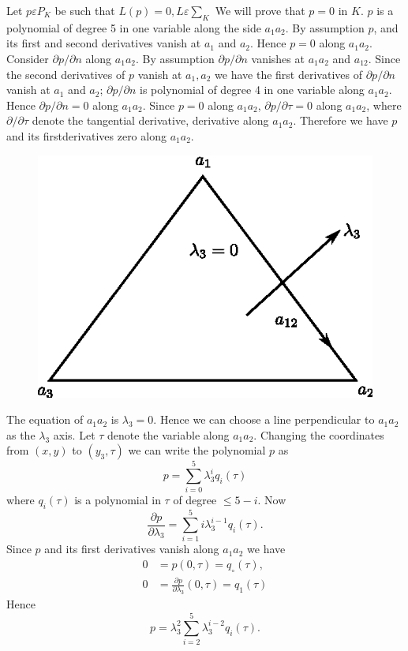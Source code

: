\begin{exam}
Let $p\varepsilon P_K$ be such that $L(p)=0, L\varepsilon\sum_K$ We
will prove that $p= 0$ in $K$. $p$ is a polynomial of degree
5 in one variable along the side $a_1 a_2$. By assumption $p$, and
its first and second derivatives vanish at $a_1$ and $a_2$. Hence
$p=0$ along $a_1 a_2$. Consider $\partial p/\partial n$ along $a_1
a_2$. By assumption $\partial p/\partial n$ vanishes at $a_1 a_2$ and
$a_{12}$. Since the second derivatives of $p$ vanish at $a_1, a_2$ we
have the first derivatives of $\partial p/\partial n$ vanish at $a_1$
and $a_2$; $\partial p/\partial n$ is polynomial of degree 4 in one
variable along $a_1 a_2$. Hence $\partial p/\partial n=0$ along $a_1
a_2$. Since $p=0$ along $a_1 a_2$, $\partial p/\partial\tau =0$ along
$a_1 a_2$, where $\partial/\partial\tau$ denote the tangential
derivative, \ie derivative along $a_1 a_2$. Therefore we have $p$ and
its first\pageoriginale derivatives zero along $a_1 a_2$. 
\begin{figure}[H]
\centering
\includegraphics{figure/fig3.10.eps}
\caption{}\label{fig3.10}
\end{figure}


The equation of $a_1 a_2$ is $\lambda_3=0$. Hence we can choose a line
perpendicular to $a_1 a_2$ as the $\lambda_3$ axis. Let $\tau$ denote
the variable along $a_1 a_2$. Changing the coordinates from $(x, y)$
to $(y_3, \tau)$ we can write the polynomial $p$ as 
$$
p=\sum\limits_{i=0}^5 \lambda_3^i q_i(\tau)
$$
where $q_i(\tau)$ is a polynomial in $\tau$ of degree $\leq 5-i$. Now 
$$
\frac{\partial p}{\partial\lambda_3}=\sum\limits_{i=1}^5
i\lambda_3^{i-1} q_i(\tau).
$$
Since $p$ and its first derivatives vanish along $a_1 a_2$ we have 
\begin{align*}
0 &= p(0,\tau)=q_\circ(\tau),\\
0 &= \frac{\partial p}{\partial\lambda_3}(0,\tau)=q_1(\tau) 
\end{align*}
Hence
$$
p=\lambda_3^2\sum\limits_{i=2}^5\lambda_3^{i-2}q_i(\tau).
$$


\end{exam}
